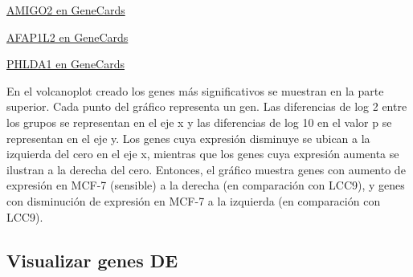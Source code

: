 \documentclass[
]{article}
\newenvironment{Shaded}{\begin{snugshade}}{\end{snugshade}}
\newcommand{\CommentTok}[1]{\textcolor[rgb]{0.56,0.35,0.01}{\textit{#1}}}
\newcommand{\DecValTok}[1]{\textcolor[rgb]{0.00,0.00,0.81}{#1}}
\newcommand{\FunctionTok}[1]{\textcolor[rgb]{0.13,0.29,0.53}{\textbf{#1}}}
\newcommand{\NormalTok}[1]{#1}
\newcommand{\OtherTok}[1]{\textcolor[rgb]{0.56,0.35,0.01}{#1}}
\newcommand{\SpecialCharTok}[1]{\textcolor[rgb]{0.81,0.36,0.00}{\textbf{#1}}}
\newcommand{\StringTok}[1]{\textcolor[rgb]{0.31,0.60,0.02}{#1}}
\begin{document}
\href{https://www.genecards.org/cgi-bin/carddisp.pl?gene=AMIGO2&keywords=AMIGO2}{AMIGO2
en GeneCards}

\href{https://www.genecards.org/cgi-bin/carddisp.pl?gene=AFAP1L2&keywords=AFAP1L2}{AFAP1L2
en GeneCards}

\href{https://www.genecards.org/cgi-bin/carddisp.pl?gene=PHLDA1&keywords=PHLDA1}{PHLDA1
en GeneCards}

En el volcanoplot creado los genes más significativos se muestran en la
parte superior. Cada punto del gráfico representa un gen. Las
diferencias de log 2 entre los grupos se representan en el eje x y las
diferencias de log 10 en el valor p se representan en el eje y. Los
genes cuya expresión disminuye se ubican a la izquierda del cero en el
eje x, mientras que los genes cuya expresión aumenta se ilustran a la
derecha del cero. Entonces, el gráfico muestra genes con aumento de
expresión en MCF-7 (sensible) a la derecha (en comparación con LCC9), y
genes con disminución de expresión en MCF-7 a la izquierda (en
comparación con LCC9).

\subsection{Visualizar genes DE}\label{visualizar-genes-de}

\begin{Shaded}
\end{Shaded}
\end{document}
